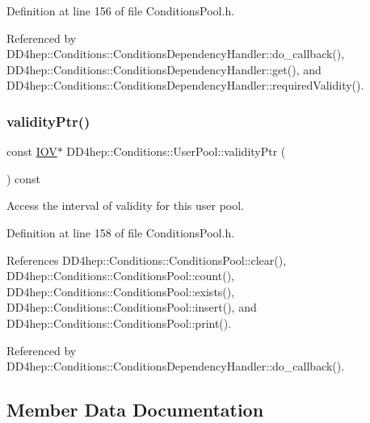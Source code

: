 Definition at line 156 of file Conditions\+Pool.\+h.



Referenced by D\+D4hep\+::\+Conditions\+::\+Conditions\+Dependency\+Handler\+::do\+\_\+callback(), D\+D4hep\+::\+Conditions\+::\+Conditions\+Dependency\+Handler\+::get(), and D\+D4hep\+::\+Conditions\+::\+Conditions\+Dependency\+Handler\+::required\+Validity().

\hypertarget{class_d_d4hep_1_1_conditions_1_1_user_pool_abc7c3d3ff45771e4e20d5d8697b18020}{}\label{class_d_d4hep_1_1_conditions_1_1_user_pool_abc7c3d3ff45771e4e20d5d8697b18020} 
\subsubsection{\texorpdfstring{validity\+Ptr()}{validityPtr()}}
{\footnotesize\ttfamily const \hyperlink{class_d_d4hep_1_1_i_o_v}{I\+OV}$\ast$ D\+D4hep\+::\+Conditions\+::\+User\+Pool\+::validity\+Ptr (\begin{DoxyParamCaption}{ }\end{DoxyParamCaption}) const\hspace{0.3cm}{\ttfamily [inline]}}



Access the interval of validity for this user pool. 



Definition at line 158 of file Conditions\+Pool.\+h.



References D\+D4hep\+::\+Conditions\+::\+Conditions\+Pool\+::clear(), D\+D4hep\+::\+Conditions\+::\+Conditions\+Pool\+::count(), D\+D4hep\+::\+Conditions\+::\+Conditions\+Pool\+::exists(), D\+D4hep\+::\+Conditions\+::\+Conditions\+Pool\+::insert(), and D\+D4hep\+::\+Conditions\+::\+Conditions\+Pool\+::print().



Referenced by D\+D4hep\+::\+Conditions\+::\+Conditions\+Dependency\+Handler\+::do\+\_\+callback().



\subsection{Member Data Documentation}
\hypertarget{class_d_d4hep_1_1_conditions_1_1_user_pool_a5d5c7664cba0150097ebb69b218d44f0}{}\label{class_d_d4hep_1_1_conditions_1_1_user_pool_a5d5c7664cba0150097ebb69b218d44f0} 
